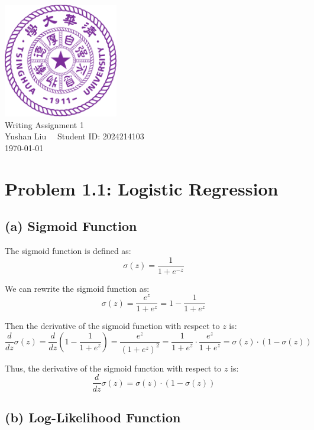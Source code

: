 \documentclass[12pt]{article}
\begin{document}
\begin{titlepage}
    \begin{center}
        \includegraphics[width=5cm]{tsinghua_logo.png}\\[4cm]  %
        {\Huge Writing Assignment 1} \\[2cm]
        {\large Yushan Liu  \ \  Student ID: 2024214103}\\[6cm]
        {\normalsize \today}\\[1cm]
    \end{center}
\end{titlepage}

\section*{Problem 1.1: Logistic Regression}

\subsection*{(a) Sigmoid Function}

The sigmoid function is defined as:
\[
    \sigma(z) = \frac{1}{1 + e^{-z}}
\]

We can rewrite the sigmoid function as:
\[
    \sigma(z) = \frac{e^z}{1 + e^z} = 1 - \frac{1}{1 + e^z}
\]

Then the derivative of the sigmoid function with respect to \( z \) is:
\[
    \frac{d}{dz} \sigma(z) = \frac{d}{dz} \left( 1 - \frac{1}{1 + e^z} \right) = \frac{e^z}{(1 + e^z)^2} = \frac{1}{1 + e^z} \cdot \frac{e^z}{1 + e^z} = \sigma(z) \cdot (1 - \sigma(z))
\]

Thus, the derivative of the sigmoid function with respect to \( z \) is:
\[
    \frac{d}{dz} \sigma(z) = \sigma(z) \cdot (1 - \sigma(z))
\]

\subsection*{(b) Log-Likelihood Function}
\end{document}
